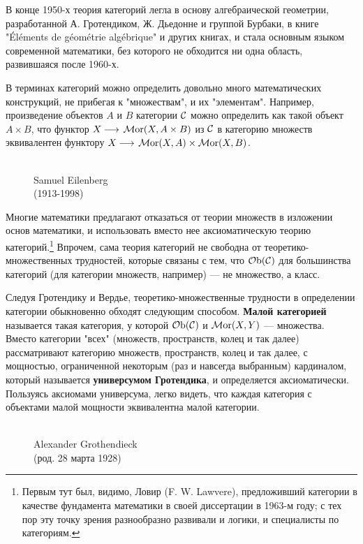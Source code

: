 \documentclass[12pt]{book}
\newcommand{\arrow}{{\:\longrightarrow\:}}
\newcommand{\Ob}{\operatorname{{\cal O}b}}
\newcommand{\Mor}{\operatorname{{\cal M}or}}
\newcommand{\cac}{{\cal C}}
\theoremstyle{upshape}
\theoremstyle{generic}
\theoremstyle{upshapenonumber}
\newcommand{\следствие}{%
     \refstepcounter{teorema}
     {\noindent\bf Следствие \thechapter.\arabic{teorema}:\ }}
\newcommand{\пример}{%
     \refstepcounter{teorema}
     {\noindent\bf Пример \thechapter.\arabic{teorema}:\ }}
\newcommand{\лемма}{%
     \refstepcounter{teorema}
     {\noindent\bf Лемма \thechapter.\arabic{teorema}:\ }}
\newcommand{\теорема}{%
     \refstepcounter{teorema}
     {\noindent\bf Теорема \thechapter.\arabic{teorema}:\ }}
\newcommand{\утверждение}{%
     \refstepcounter{teorema}
     {\noindent\bf Утверждение \thechapter.\arabic{teorema}:\ }}
\def\бф{\bf}
\begin{document}
В конце 1950-х теория категорий легла в основу
алгебраической геометрии, разработанной А. Гротендиком,
Ж. Дьедонне и группой Бурбаки, в книге
"\'El\'ements de g\'eom\'etrie alg\'ebrique" и других книгах, 
и стала основным языком современной математики, без
которого не обходится ни одна область, развившаяся
после 1960-х. 

В терминах категорий можно определить довольно много
математических конструкций, не прибегая к "множествам",
и их "элементам". Например, произведение объектов
$A$ и $B$ категории $\cac$ можно определить
как такой объект $A\times B$, что 
функтор $X \arrow \Mor(X, A\times B)$ из $\cac$ в категорию множеств
эквивалентен функтору $X \arrow \Mor(X, A) \times \Mor(X, B)$.


\begin{figure}[ht]
\begin{center}
\\
{Samuel Eilenberg \\
(1913-1998)}
\end{center}
\end{figure}


Многие математики предлагают отказаться от теории
множеств в изложении основ математики, и использовать
вместо нее аксиоматическую теорию
категорий.\footnote{Первым
тут был, видимо, Ловир (F. W. Lawvere), предложивший
категории в качестве фундамента математики
в своей диссертации в 1963-м году; с тех пор
эту точку зрения разнообразно развивали и
логики, и специалисты по категориям.}
Впрочем, сама теория категорий не
свободна от теоретико-множественных трудностей,
которые связаны с тем, что $\Ob(\cac)$ для 
большинства категорий (для категории множеств,
например) --- не множество, а класс.

Следуя Гротендику и Вердье,
теоретико-множественные трудности в определении
категории обыкновенно обходят следующим способом.
{\бф Малой категорией} называется такая категория,
у которой $\Ob(\cac)$ и $\Mor(X,Y)$ --- множества.
Вместо категории "всех" (множеств, пространств, колец
и так далее) рассматривают категорию множеств, пространств, колец
и так далее, с мощностью, ограниченной некоторым
(раз и навсегда выбранным) кардиналом, который
называется {\бф универсумом Гротендика},
и определяется аксиоматически.
Пользуясь аксиомами универсума,
легко видеть, что каждая категория
с объектами малой мощности эквивалентна 
малой категории.

\begin{figure}[ht]
\begin{center}
\\
{Alexander Grothendieck \\
(род. 28 марта 1928)}
\end{center}
\end{figure}
\end{document}
